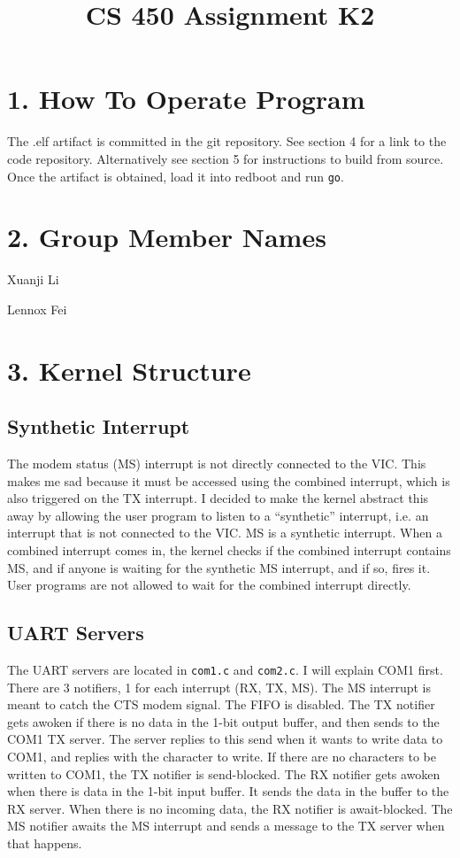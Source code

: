 \documentclass{article}
\title{CS 450 Assignment K2}
\date{}
\begin{document}
\maketitle


\section*{1. How To Operate Program}

The .elf artifact is committed in the git repository. See section 4 for a link to the code repository. Alternatively see section 5 for instructions to build from source. Once the artifact is obtained, load it into redboot and run \texttt{go}.

\section*{2. Group Member Names}

Xuanji Li

Lennox Fei

\section*{3. Kernel Structure}

\subsection*{Synthetic Interrupt}

The modem status (MS) interrupt is not directly connected to the VIC. This makes me sad because it must be accessed using the combined interrupt, which is also triggered on the TX interrupt. I decided to make the kernel abstract this away by allowing the user program to listen to a ``synthetic'' interrupt, i.e. an interrupt that is not connected to the VIC. MS is a synthetic interrupt. When a combined interrupt comes in, the kernel checks if the combined interrupt contains MS, and if anyone is waiting for the synthetic MS interrupt, and if so, fires it. User programs are not allowed to wait for the combined interrupt directly.

\subsection*{UART Servers}

The UART servers are located in \texttt{com1.c} and \texttt{com2.c}. I will explain COM1 first. There are 3 notifiers, 1 for each interrupt (RX, TX, MS). The MS interrupt is meant to catch the CTS modem signal. The FIFO is disabled. The TX notifier gets awoken if there is no data in the 1-bit output buffer, and then sends to the COM1 TX server. The server replies to this send when it wants to write data to COM1, and replies with the character to write. If there are no characters to be written to COM1, the TX notifier is send-blocked. The RX notifier gets awoken when there is data in the 1-bit input buffer. It sends the data in the buffer to the RX server. When there is no incoming data, the RX notifier is await-blocked. The MS notifier awaits the MS interrupt and sends a message to the TX server when that happens.
\end{document}

